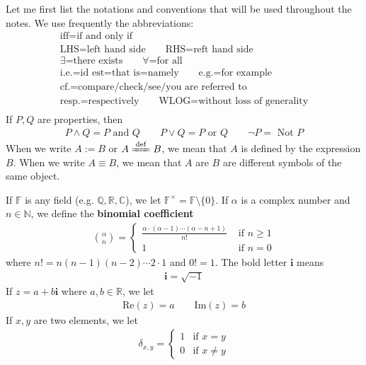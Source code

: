 \documentclass[12pt,b5paper,notitlepage]{article}
\theoremstyle{definition}
\theoremstyle{plain}
\newcommand{\im}{\mathbf{i}}
\newcommand{\Cbb}{\mathbb C}
\newcommand{\Nbb}{\mathbb N}
\newcommand{\Qbb}{\mathbb Q}
\newcommand{\Rbb}{\mathbb R}
\newcommand{\Real}{\mathrm{Re}}
\newcommand{\Imag}{\mathrm{Im}}
\newcommand{\Fbb}{\mathbb F}
\newcommand{\dps}{\displaystyle}
\numberwithin{equation}{section}
\begin{document}
Let me first list the notations and conventions that will be used throughout the notes. We use frequently the abbreviations:
\begin{gather*}
\text{iff=if and only if}\\
\text{LHS=left hand side}\qquad
\text{RHS=reft hand side}\\
\text{$\exists$=there exists}\qquad \text{$\forall$=for all}\\
\text{i.e.=id est=that is=namely}\qquad\text{e.g.=for example}\\
\text{cf.=compare/check/see/you are referred to}\\
\text{resp.=respectively}\qquad 
\text{WLOG=without loss of generality}\\
\end{gather*}
If $P,Q$ are properties, then
\begin{align*}
P\land Q=P\text{ and }Q\qquad P\lor Q=P\text{ or }Q\qquad \neg P=\text{ Not }P
\end{align*}
When we write $A:=B$ or $A\xlongequal{\mathrm{def}}B$, we mean that $A$ is defined by the expression $B$. When we write $A\equiv B$, we mean that $A$ are $B$ are different symbols of the same object.

If $\Fbb$ is any field (e.g. $\Qbb,\Rbb,\Cbb$), we let $\Fbb^\times=\Fbb\setminus\{0\}$. \index{F@$\Fbb^\times=\Fbb\setminus\{0\}$} If $\alpha$ is a complex number and $n\in\Nbb$, we define the \textbf{binomial coefficient}  
\begin{align}
{\alpha\choose n}=\left\{
\begin{array}{ll}
\dps\frac{\alpha\cdot(\alpha-1)\cdots (\alpha-n+1)}{n!} &\text{ if }n\geq 1\\[1ex]
1&\text{ if }n=0
\end{array}
\right.
\end{align}
where $n!=n(n-1)(n-2)\cdots 2\cdot 1$ and $0!=1$. The bold letter $\im$ means \index{i@$\im=\sqrt{-1}$}
\begin{align*}
\im=\sqrt{-1}
\end{align*}
If $z=a+b\im$ where $a,b\in\Rbb$, we let
\begin{align*}
\Real(z)=a\qquad \Imag(z)=b
\end{align*}
If $x,y$ are two elements, we let 
\begin{align}\label{eq154}
\delta_{x,y}=\left\{
\begin{array}{ll}
1&\text{if }x=y\\
0&\text{if }x\neq y
\end{array}
\right.
\end{align}
\end{document}
